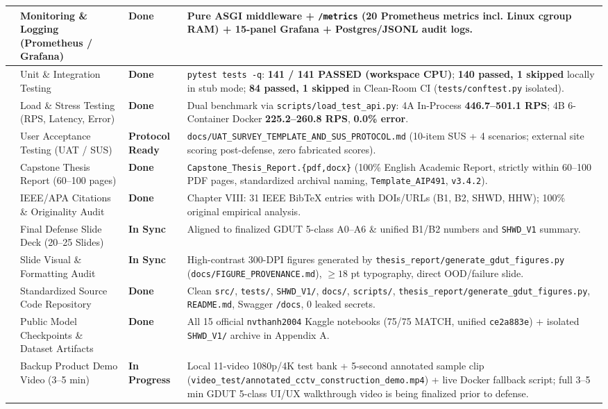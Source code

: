 \begin{longtable}{|>{\centering\arraybackslash}p{0.6cm}|>{\raggedright\arraybackslash}p{3.4cm}|>{\raggedright\arraybackslash}p{1.8cm}|>{\raggedright\arraybackslash}p{7.8cm}|}
8 & Monitoring \& Logging (Prometheus / Grafana) & \textbf{Done} & Pure ASGI middleware + \texttt{/metrics} (20 Prometheus metrics incl. Linux cgroup RAM) + 15-panel Grafana + Postgres/JSONL audit logs. \\ \hline
9 & Unit \& Integration Testing & \textbf{Done} & \texttt{pytest tests -q}: \textbf{141 / 141 PASSED (workspace CPU)}; \textbf{140 passed, 1 skipped} locally in stub mode; \textbf{84 passed, 1 skipped} in Clean-Room CI (\nolinkurl{tests/conftest.py} isolated). \\ \hline
10 & Load \& Stress Testing (RPS, Latency, Error) & \textbf{Done} & Dual benchmark via \nolinkurl{scripts/load_test_api.py}: 4A In-Process \textbf{446.7--501.1 RPS}; 4B 6-Container Docker \textbf{225.2--260.8 RPS}, \textbf{0.0\% error}. \\ \hline
11 & User Acceptance Testing (UAT / SUS) & \textbf{Protocol Ready} & \nolinkurl{docs/UAT_SURVEY_TEMPLATE_AND_SUS_PROTOCOL.md} (10-item SUS + 4 scenarios; external site scoring post-defense, zero fabricated scores). \\ \hline
12 & Capstone Thesis Report (60--100 pages) & \textbf{Done} & \nolinkurl{Capstone_Thesis_Report.{pdf,docx}} (100\% English Academic Report, strictly within 60--100 PDF pages, standardized archival naming, \texttt{Template\_AIP491}, \texttt{v3.4.2}). \\ \hline
13 & IEEE/APA Citations \& Originality Audit & \textbf{Done} & Chapter VIII: 31 IEEE BibTeX entries with DOIs/URLs (B1, B2, SHWD, HHW); 100\% original empirical analysis. \\ \hline
14 & Final Defense Slide Deck (20--25 Slides) & \textbf{In Sync} & Aligned to finalized GDUT 5-class A0--A6 \& unified B1/B2 numbers and \texttt{SHWD\_V1} summary. \\ \hline
15 & Slide Visual \& Formatting Audit & \textbf{In Sync} & High-contrast 300-DPI figures generated by \nolinkurl{thesis_report/generate_gdut_figures.py} (\nolinkurl{docs/FIGURE_PROVENANCE.md}), $\ge 18$ pt typography, direct OOD/failure slide. \\ \hline
16 & Standardized Source Code Repository & \textbf{Done} & Clean \texttt{src/}, \texttt{tests/}, \texttt{SHWD\_V1/}, \texttt{docs/}, \texttt{scripts/}, \nolinkurl{thesis_report/generate_gdut_figures.py}, \texttt{README.md}, Swagger \texttt{/docs}, 0 leaked secrets. \\ \hline
17 & Public Model Checkpoints \& Dataset Artifacts & \textbf{Done} & All 15 official \texttt{nvthanh2004} Kaggle notebooks (75/75 MATCH, unified \texttt{ce2a883e}) + isolated \texttt{SHWD\_V1/} archive in Appendix A. \\ \hline
18 & Backup Product Demo Video (3--5 min) & \textbf{In Progress} & Local 11-video 1080p/4K test bank + 5-second annotated sample clip (\nolinkurl{video_test/annotated_cctv_construction_demo.mp4}) + live Docker fallback script; full 3--5 min GDUT 5-class UI/UX walkthrough video is being finalized prior to defense. \\ \hline
\end{longtable}

